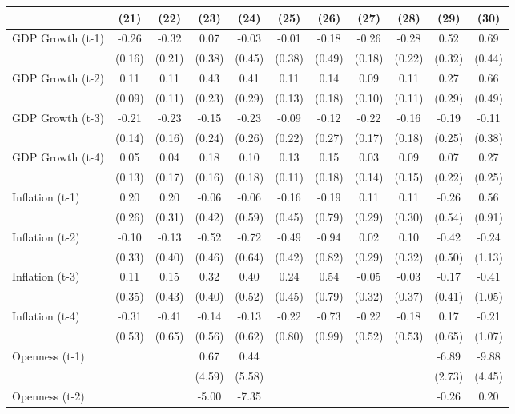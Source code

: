 \begin{tabular}{lcccccccccc}
\toprule
& (21) & (22) & (23) & (24) & (25) & (26) & (27) & (28) & (29) & (30) \\ 
\midrule
GDP Growth (t-1) & -0.26 & -0.32 & 0.07 & -0.03 & -0.01 & -0.18 & -0.26 & -0.28 & 0.52 & 0.69 \\
& (0.16) & (0.21) & (0.38) & (0.45) & (0.38) & (0.49) & (0.18) & (0.22) & (0.32) & (0.44) \\
GDP Growth (t-2) & 0.11 & 0.11 & 0.43 & 0.41 & 0.11 & 0.14 & 0.09 & 0.11 & 0.27 & 0.66 \\
& (0.09) & (0.11) & (0.23) & (0.29) & (0.13) & (0.18) & (0.10) & (0.11) & (0.29) & (0.49) \\
GDP Growth (t-3) & -0.21 & -0.23 & -0.15 & -0.23 & -0.09 & -0.12 & -0.22 & -0.16 & -0.19 & -0.11 \\
& (0.14) & (0.16) & (0.24) & (0.26) & (0.22) & (0.27) & (0.17) & (0.18) & (0.25) & (0.38) \\
GDP Growth (t-4) & 0.05 & 0.04 & 0.18 & 0.10 & 0.13 & 0.15 & 0.03 & 0.09 & 0.07 & 0.27 \\
& (0.13) & (0.17) & (0.16) & (0.18) & (0.11) & (0.18) & (0.14) & (0.15) & (0.22) & (0.25) \\
Inflation (t-1) & 0.20 & 0.20 & -0.06 & -0.06 & -0.16 & -0.19 & 0.11 & 0.11 & -0.26 & 0.56 \\
& (0.26) & (0.31) & (0.42) & (0.59) & (0.45) & (0.79) & (0.29) & (0.30) & (0.54) & (0.91) \\
Inflation (t-2) & -0.10 & -0.13 & -0.52 & -0.72 & -0.49 & -0.94 & 0.02 & 0.10 & -0.42 & -0.24 \\
& (0.33) & (0.40) & (0.46) & (0.64) & (0.42) & (0.82) & (0.29) & (0.32) & (0.50) & (1.13) \\
Inflation (t-3) & 0.11 & 0.15 & 0.32 & 0.40 & 0.24 & 0.54 & -0.05 & -0.03 & -0.17 & -0.41 \\
& (0.35) & (0.43) & (0.40) & (0.52) & (0.45) & (0.79) & (0.32) & (0.37) & (0.41) & (1.05) \\
Inflation (t-4) & -0.31 & -0.41 & -0.14 & -0.13 & -0.22 & -0.73 & -0.22 & -0.18 & 0.17 & -0.21 \\
& (0.53) & (0.65) & (0.56) & (0.62) & (0.80) & (0.99) & (0.52) & (0.53) & (0.65) & (1.07) \\
Openness (t-1) &  &  & 0.67 & 0.44 &  &  &  &  & -6.89 & -9.88 \\
&  &  & (4.59) & (5.58) &  &  &  &  & (2.73) & (4.45) \\
Openness (t-2) &  &  & -5.00 & -7.35 &  &  &  &  & -0.26 & 0.20 \\

\end{tabular}
